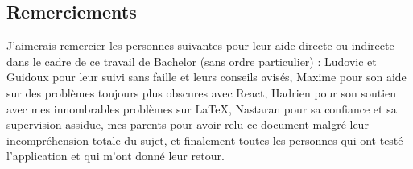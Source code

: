 \subsection{Remerciements}

J'aimerais remercier les personnes suivantes pour leur aide directe ou indirecte dans le cadre de ce travail de Bachelor (sans ordre particulier) : Ludovic et Guidoux pour leur suivi sans faille et leurs conseils avisés, Maxime pour son aide sur des problèmes toujours plus obscures avec React, Hadrien pour son soutien avec mes innombrables problèmes sur LaTeX, Nastaran pour sa confiance et sa supervision assidue, mes parents pour avoir relu ce document malgré leur incompréhension totale du sujet, et finalement toutes les personnes qui ont testé l'application et qui m'ont donné leur retour.
